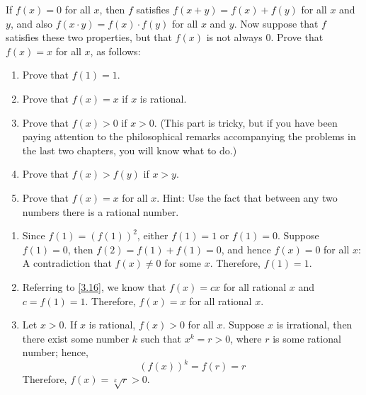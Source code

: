 \begin{pr} \label{3.17}
  If $f(x) = 0$ for all $x$, then $f$ satisfies $f(x + y) = f(x) + f(y)$ for all
  $x$ and $y$, and also $f(x \cdot y) = f(x) \cdot f(y)$ for all $x$ and $y$. Now suppose
  that $f$ satisfies these two properties, but that $f(x)$ is not always $0$. Prove
  that $f(x) = x$ for all $x$, as follows:
  \begin{enumerate}[label = (\alph*)]
    \item Prove that $f(1) = 1$.
    \item Prove that $f(x) = x$ if $x$ is rational.
    \item Prove that $f(x) > 0$ if $x > 0$. (This part is tricky, but if you have
    been paying attention to the philosophical remarks accompanying the problems
    in the last two chapters, you will know what to do.)
    \item Prove that $f(x) > f(y)$ if $x > y$.
    \item Prove that $f(x) = x$ for all $x$. Hint: Use the fact that between
    any two numbers there is a rational number.
  \end{enumerate}
\end{pr}

\begin{solution}
  \begin{enumerate}[label = (\alph*)]
    \item Since $f(1) = (f(1))^2$, either $f(1) = 1$ or $f(1) = 0$. Suppose $f(1) = 0$,
    then $f(2) = f(1) + f(1) = 0$, and hence $f(x) = 0$ for all $x$: A contradiction
    that $f(x) \neq 0$ for some $x$. Therefore, $f(1) = 1$.
    \item Referring to \ref{3.16}, we know that $f(x) = cx$ for all rational $x$
    and $c = f(1) = 1$. Therefore, $f(x) = x$ for all rational $x$.
    \item Let $x > 0$. If $x$ is rational, $f(x) > 0$ for all $x$. Suppose $x$ is
    irrational, then there exist some number $k$ such that $x^k = r > 0$, where $r$
    is some rational number; hence,
    \begin{equation*}
      (f(x))^k = f(r) = r
    \end{equation*}
    Therefore, $f(x) = \sqrt[k]{r} > 0$.
  \end{enumerate}
\end{solution}
